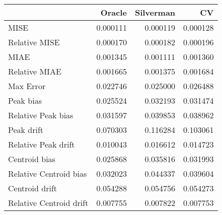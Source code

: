 \begin{tabular}{lrrr}
  \hline
 & Oracle & Silverman & CV \\ 
  \hline
MISE & 0.000111 & 0.000119 & 0.000128 \\ 
  Relative MISE & 0.000170 & 0.000182 & 0.000196 \\ 
  MIAE & 0.001345 & 0.001111 & 0.001360 \\ 
  Relative MIAE & 0.001665 & 0.001375 & 0.001684 \\ 
  Max Error & 0.022746 & 0.025000 & 0.026488 \\ 
  Peak bias & 0.025524 & 0.032193 & 0.031474 \\ 
  Relative Peak bias & 0.031597 & 0.039853 & 0.038962 \\ 
  Peak drift & 0.070303 & 0.116284 & 0.103061 \\ 
  Relative Peak drift & 0.010043 & 0.016612 & 0.014723 \\ 
  Centroid bias & 0.025868 & 0.035816 & 0.031993 \\ 
  Relative Centroid bias & 0.032023 & 0.044337 & 0.039604 \\ 
  Centroid drift & 0.054288 & 0.054756 & 0.054273 \\ 
  Relative Centroid drift & 0.007755 & 0.007822 & 0.007753 \\ 
   \hline
\end{tabular}
